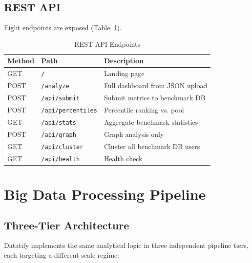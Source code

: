 \documentclass[conference]{IEEEtran}
\begin{document}
\subsection{REST API}

Eight endpoints are exposed (Table~\ref{tab:api}).

\begin{table}[ht]
\caption{REST API Endpoints}
\label{tab:api}
\centering
\begin{tabular}{lll}
\toprule
\textbf{Method} & \textbf{Path} & \textbf{Description} \\
\midrule
GET  & \texttt{/}                & Landing page \\
POST & \texttt{/analyze}         & Full dashboard from JSON upload \\
POST & \texttt{/api/submit}      & Submit metrics to benchmark DB \\
POST & \texttt{/api/percentiles} & Percentile ranking vs. pool \\
GET  & \texttt{/api/stats}       & Aggregate benchmark statistics \\
POST & \texttt{/api/graph}       & Graph analysis only \\
GET  & \texttt{/api/cluster}     & Cluster all benchmark DB users \\
GET  & \texttt{/api/health}      & Health check \\
\bottomrule
\end{tabular}
\end{table}

\section{Big Data Processing Pipeline}

\subsection{Three-Tier Architecture}

Datatify implements the same analytical logic in three independent pipeline
tiers, each targeting a different scale regime:
\end{document}
